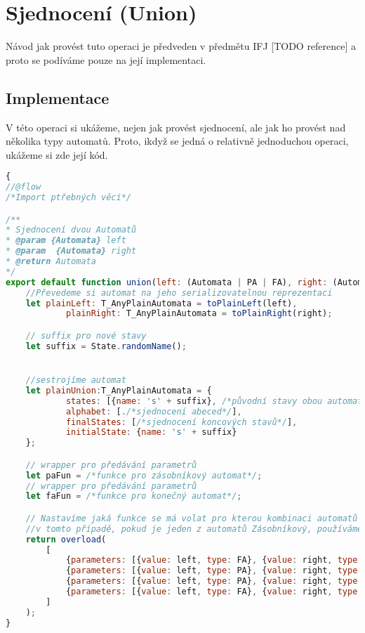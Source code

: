 \section{Sjednocení (Union)}
Návod jak provést tuto operaci je předveden v předmětu IFJ [TODO reference] a proto se podíváme pouze na její implementaci.
\subsection{Implementace}
V této operaci si ukážeme, nejen jak provést sjednocení, ale jak ho provést nad několika typy automatů. Proto, ikdyž se jedná o relativně jednoduchou operaci, ukážeme si zde její kód.

\begin{lstlisting}[language=JavaScript,label={example:union}, caption={Ukázka implementace operace Union (\textit{src/operations/union.js})}]
{
//@flow
/*Import ptřebných věcí*/

/**
* Sjednocení dvou Automatů
* @param {Automata} left
* @param  {Automata} right
* @return Automata
*/
export default function union(left: (Automata | PA | FA), right: (Automata | PA | FA)) {
	//Převedeme si automat na jeho serializovatelnou reprezentaci
	let plainLeft: T_AnyPlainAutomata = toPlainLeft(left),
			plainRight: T_AnyPlainAutomata = toPlainRight(right);

	// suffix pro nové stavy
	let suffix = State.randomName();


	//sestrojíme automat
	let plainUnion:T_AnyPlainAutomata = {
			states: [{name: 's' + suffix}, /*původní stavy obou automatů*/],
			alphabet: [./*sjednocení abeced*/],
			finalStates: [/*sjednocení koncových stavů*/],
			initialState: {name: 's' + suffix}
	};

	// wrapper pro předávání parametrů
	let paFun = /*funkce pro zásobníkový automat*/;
	// wrapper pro předávání parametrů
	let faFun = /*funkce pro konečný automat*/;

	// Nastavíme jaká funkce se má volat pro kterou kombinaci automatů
	//v tomto případě, pokud je jeden z automatů Zásobníkový, používáme funkci additionalPA
	return overload(
		[
			{parameters: [{value: left, type: FA}, {value: right, type: PA}], func: paFun},
			{parameters: [{value: left, type: PA}, {value: right, type: FA}], func: paFun},
			{parameters: [{value: left, type: PA}, {value: right, type: PA}], func: paFun},
			{parameters: [{value: left, type: FA}, {value: right, type: FA}], func: faFun},
		]
	);
}

\end{lstlisting}